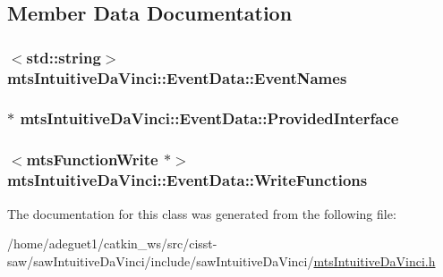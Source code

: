 \subsection{Member Data Documentation}
\hypertarget{classmts_intuitive_da_vinci_1_1_event_data_a6d5590c5e9e669ac7e53bbe75fea5955}{
\subsubsection[{Event\-Names}]{$<$std\-::string$>$ mts\-Intuitive\-Da\-Vinci\-::\-Event\-Data\-::\-Event\-Names}}\label{classmts_intuitive_da_vinci_1_1_event_data_a6d5590c5e9e669ac7e53bbe75fea5955}
\hypertarget{classmts_intuitive_da_vinci_1_1_event_data_a8dfa40ab4f12242f85d2072cae184fd1}{
\subsubsection[{Provided\-Interface}]{$\ast$ mts\-Intuitive\-Da\-Vinci\-::\-Event\-Data\-::\-Provided\-Interface}}\label{classmts_intuitive_da_vinci_1_1_event_data_a8dfa40ab4f12242f85d2072cae184fd1}
\hypertarget{classmts_intuitive_da_vinci_1_1_event_data_a58379f1c62378447780d1b5a7017be47}{
\subsubsection[{Write\-Functions}]{$<${\bf mts\-Function\-Write} $\ast$$>$ mts\-Intuitive\-Da\-Vinci\-::\-Event\-Data\-::\-Write\-Functions}}\label{classmts_intuitive_da_vinci_1_1_event_data_a58379f1c62378447780d1b5a7017be47}


The documentation for this class was generated from the following file\-:\begin{DoxyCompactItemize}
\item 
/home/adeguet1/catkin\-\_\-ws/src/cisst-\/saw/saw\-Intuitive\-Da\-Vinci/include/saw\-Intuitive\-Da\-Vinci/\hyperlink{mts_intuitive_da_vinci_8h}{mts\-Intuitive\-Da\-Vinci.\-h}\end{DoxyCompactItemize}
